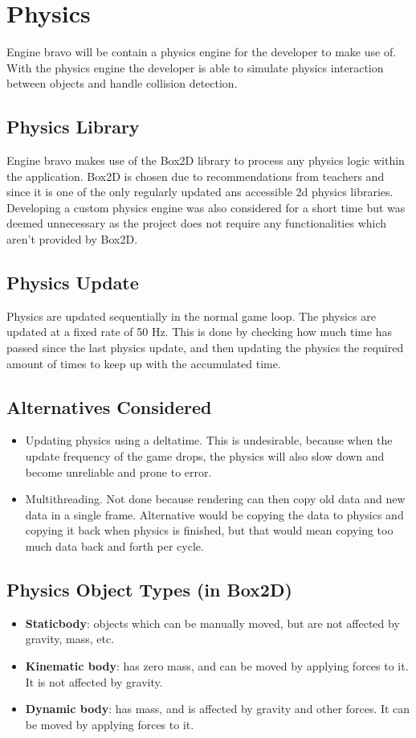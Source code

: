 \section{Physics}
\label{sec:physics}
Engine bravo will be contain a physics engine for the developer to make use of.
With the physics engine the developer is able to simulate physics interaction between objects and handle collision detection.

\subsection{Physics Library}
Engine bravo makes use of the Box2D library to process any physics logic within the application. 
Box2D is chosen due to recommendations from teachers and since it is one of the only regularly updated ans accessible 2d physics libraries.
Developing a custom physics engine was also considered for a short time but was deemed unnecessary as the project does not require any functionalities which aren't provided by Box2D.

\subsection{Physics Update}
Physics are updated sequentially in the normal game loop.
The physics are updated at a fixed rate of 50 Hz. This is done by checking how much time has passed since the last physics update, and then updating the physics the required amount of times to keep up with the accumulated time.

\subsection{Alternatives Considered}
\begin{itemize}
    \item Updating physics using a deltatime. This is undesirable, because when the update frequency of the game drops, the physics will also slow down and become unreliable and prone to error.
    \item Multithreading. Not done because rendering can then copy old data and new data in a single frame. Alternative would be copying the data to physics and copying it back when physics is finished, but that would mean copying too much data back and forth per cycle.
\end{itemize}

\subsection{Physics Object Types (in Box2D)}
\begin{itemize}
    \item \textbf{Staticbody}: objects which can be manually moved, but are not affected by gravity, mass, etc.
    \item \textbf{Kinematic body}: has zero mass, and can be moved by applying forces to it. It is not affected by gravity.
    \item \textbf{Dynamic body}: has mass, and is affected by gravity and other forces. It can be moved by applying forces to it.
\end{itemize}

